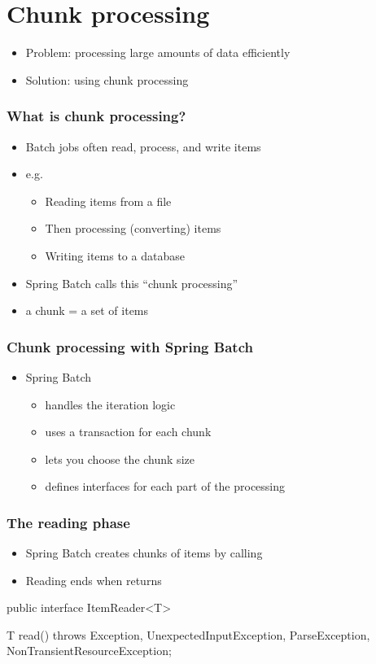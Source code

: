 \section{Chunk processing}

\begin{frame}
 \begin{itemize}
  \item Problem: processing large amounts of data efficiently
  \item Solution: using chunk processing
 \end{itemize}
\end{frame}

\begin{frame}
 \frametitle{What is chunk processing?}
 \begin{itemize}
  \item Batch jobs often read, process, and write items
  \item e.g.
  \begin{itemize}
    \item Reading items from a file
    \item Then processing (converting) items
    \item Writing items to a database  
  \end{itemize}
  \item Spring Batch calls this ``chunk processing''
  \item a chunk = a set of items
 \end{itemize}
\end{frame}


\begin{frame}
 \frametitle{Chunk processing with Spring Batch}
 \begin{itemize}
  \item Spring Batch
  \begin{itemize}
    \item handles the iteration logic
    \item uses a transaction for each chunk
    \item lets you choose the chunk size
    \item defines interfaces for each part of the processing
  \end{itemize}
 \end{itemize}
\end{frame}


\begin{frame}[fragile]
\frametitle{The reading phase}
\begin{itemize}
 \item Spring Batch creates chunks of items by calling 
 \item Reading ends when  returns 
\end{itemize}

\begin{javacode}
public interface ItemReader<T> {

  T read() throws Exception, UnexpectedInputException, 
                  ParseException, NonTransientResourceException;

}
\end{javacode}
\end{frame}

